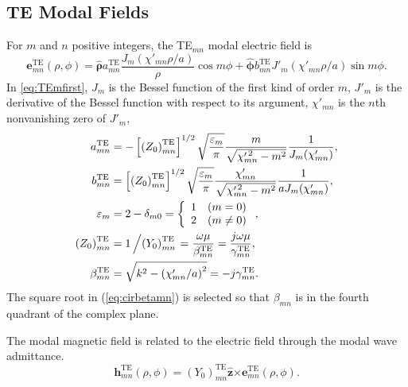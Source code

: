 \documentclass[11pt]{article}
\newcommand{\z}{\boldsymbol{\hat{z}}}
\newcommand{\cross}{\boldsymbol{\times}}
\newcommand{\e}{\boldsymbol{e}}
\newcommand{\h}{\boldsymbol{h}}
\newcommand{\phihat}{\boldsymbol{\hat{\phi}}}
\newcommand{\rhohat}{\boldsymbol{\hat{\rho}}}
\newcommand{\TE}{\text{TE}}
\newcommand{\psq}{^{\prime \,\raisebox{0.2ex}{$\scriptstyle2$}}}
\begin{document}
\subsection{TE Modal Fields}
For $m$ and $n$ positive integers, the TE$_{mn}$ modal electric field is
\begin{equation}
  \e_{mn}^{\TE}(\rho,\phi) = \rhohat a^{\TE}_{mn} 
            \frac{J_m(\chi'_{mn}\rho/a)}{\rho}  \cos m\phi +
            \phihat b^{\TE}_{mn} J'_m(\chi'_{mn}\rho/a) \sin m\phi.
  \label{eq:TEmfirst}
\end{equation}
In \eqref{eq:TEmfirst},
$J_m$ is the Bessel function of the first kind of order $m$, $J'_m$ is the
derivative of the Bessel function with respect to its argument, $\chi'_{mn}$
is the $n$th nonvanishing zero of $J'_m$,
\begin{align}
  a^{\TE}_{mn} &= -\left[ \left( Z_0 \right) ^{\TE} _{mn} \right]^{1/2}
             \sqrt{\frac{\varepsilon_m}{\pi}}
             \frac{m}{\sqrt{\chi_{mn}\psq - m^2}}
             \frac{1}{J_m(\chi'_{mn})}, \\
  b^{\TE}_{mn} &= \left[ \left( Z_0 \right) ^{\TE} _{mn} \right]^{1/2}
             \sqrt{\frac{\varepsilon_m}{\pi}}
             \frac{\chi'_{mn}}{\sqrt{\chi_{mn}\psq - m^2}}
             \frac{1}{a J_m(\chi'_{mn})},  \\
  \varepsilon_{m} &= 2 - \delta_{m0} = \left\{ \begin{array}{ll}
                                1 & (m=0) \\
                                2 & (m \neq 0)
                              \end{array}
                       \right., \\
  \left( Z_0 \right) ^{\TE} _{mn} &= 1\left/ \left(Y_0\right)^{\TE}_{mn}
      \right.  = 
     \frac{\omega\mu}{\beta^{\TE}_{mn}} 
     =  \frac{j\omega\mu}{\gamma^{\TE}_{mn}}, \\
  \beta^{\TE}_{mn} &= \sqrt{k^2 - \left( \chi'_{mn}/a\right)^2}
    =  -j\gamma^{\TE}_{mn}.  \label{eq:cirbetamn}
\end{align}
The square root in (\ref{eq:cirbetamn}) is selected so that $\beta_{mn}$
is in the fourth quadrant of the complex plane.

The modal magnetic field is related to the electric field through
the modal wave admittance.
\begin{equation}
  \h^{\TE}_{mn}(\rho,\phi) = \left(Y_0\right)^{\TE}_{mn} \z \cross 
      \e^{\TE}_{mn}(\rho,\phi).
\end{equation}
\end{document}
